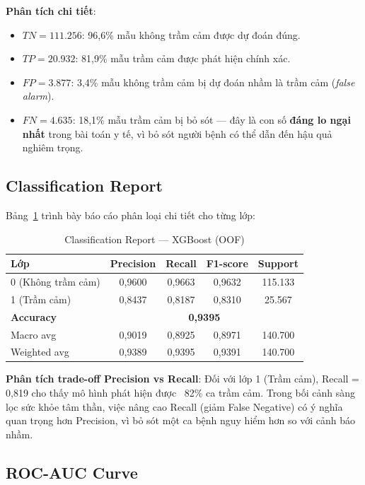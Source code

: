 \textbf{Phân tích chi tiết}:
\begin{itemize}[noitemsep]
    \item $TN = 111.256$: 96,6\% mẫu không trầm cảm được dự đoán đúng.
    \item $TP = 20.932$: 81,9\% mẫu trầm cảm được phát hiện chính xác.
    \item $FP = 3.877$: 3,4\% mẫu không trầm cảm bị dự đoán nhầm là trầm cảm (\textit{false alarm}).
    \item $FN = 4.635$: 18,1\% mẫu trầm cảm bị bỏ sót --- đây là con số \textbf{đáng lo ngại nhất} trong bài toán y tế, vì bỏ sót người bệnh có thể dẫn đến hậu quả nghiêm trọng.
\end{itemize}

\subsection{Classification Report}
\label{subsec:classification_report}

Bảng~\ref{tab:classification_report} trình bày báo cáo phân loại chi tiết cho từng lớp:

\begin{table}[H]
\centering
\caption{Classification Report --- XGBoost (OOF)}
\label{tab:classification_report}
\begin{tabular}{lcccc}
\toprule
\textbf{Lớp} & \textbf{Precision} & \textbf{Recall} & \textbf{F1-score} & \textbf{Support} \\
\midrule
0 (Không trầm cảm) & 0,9600 & 0,9663 & 0,9632 & 115.133 \\
1 (Trầm cảm) & 0,8437 & 0,8187 & 0,8310 & 25.567 \\
\midrule
\textbf{Accuracy} & \multicolumn{4}{c}{\textbf{0,9395}} \\
Macro avg & 0,9019 & 0,8925 & 0,8971 & 140.700 \\
Weighted avg & 0,9389 & 0,9395 & 0,9391 & 140.700 \\
\bottomrule
\end{tabular}
\end{table}

\textbf{Phân tích trade-off Precision vs Recall}: Đối với lớp 1 (Trầm cảm), Recall = 0,819 cho thấy mô hình phát hiện được ~82\% ca trầm cảm. Trong bối cảnh sàng lọc sức khỏe tâm thần, việc nâng cao Recall (giảm False Negative) có ý nghĩa quan trọng hơn Precision, vì bỏ sót một ca bệnh nguy hiểm hơn so với cảnh báo nhầm.

\subsection{ROC-AUC Curve}
\label{subsec:roc_auc}


